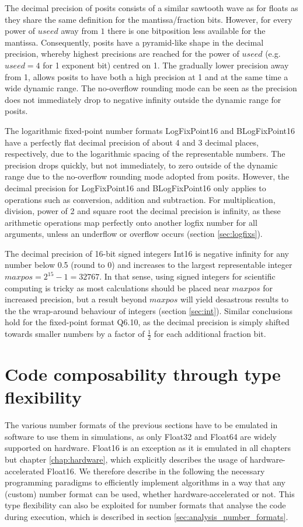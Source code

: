 The decimal precision of posits consists of a similar sawtooth wave as for floats as they share the same definition 
for the mantissa/fraction bits. However, for every power of $useed$ away from $1$ there is one bitposition less
available for the mantissa. Consequently, posits have a pyramid-like shape in the decimal precision, whereby
highest precisions are reached for the power of $useed$ (e.g. $useed = 4$ for 1 exponent bit) centred on 1.
The gradually lower precision away from 1, allows posits to have both a high precision at 1 and at the same time
a wide dynamic range. The no-overflow rounding mode can be seen as the precision does not immediately drop
to negative infinity outside the dynamic range for posits.

The logarithmic fixed-point number formats LogFixPoint16 and BLogFixPoint16 have a perfectly flat decimal precision
of about 4 and 3 decimal places, respectively, due to the logarithmic spacing of the representable numbers.
The precision drops quickly, but not immediately, to zero outside of the dynamic range due to the no-overflow rounding
mode adopted from posits. However, the decimal precision for LogFixPoint16 and BLogFixPoint16 only applies to
operations such as conversion, addition and subtraction. For multiplication, division, power of 2 and square root 
the decimal precision is infinity, as these arithmetic operations map perfectly onto another logfix number for all arguments,
unless an underflow or overflow occurs (section \ref{sec:logfixs}).

The decimal precision of 16-bit signed integers Int16 is negative infinity for any number below 0.5 (round to 0) and
increases to the largest representable integer $maxpos = 2^{15} - 1 =  32767$. In that sense, using signed integers for scientific
computing is tricky as most calculations should be placed near $maxpos$ for increased precision, but a result beyond
$maxpos$ will yield desastrous results to the the wrap-around behaviour of integers (section \ref{sec:int}).
Similar conclusions hold for the fixed-point format Q6.10, as the decimal precision is simply shifted towards smaller
numbers by a factor of $\tfrac{1}{2}$ for each additional fraction bit.

\section{Code composability through type flexibility}
\label{sec:type_flexible}

The various number formats of the previous sections have to be emulated in software to use them in simulations, as only
Float32 and Float64 are widely supported on hardware. Float16 is an exception as it is emulated in all chapters but
chapter \ref{chap:hardware}, which explicitly describes the usage of hardware-accelerated Float16. We therefore
describe in the following the necessary programming paradigms to efficiently implement algorithms in a way
that any (custom) number format can be used, whether hardware-accelerated or not. This type flexibility can also
be exploited for number formats that analyse the code during execution, which is described in section \ref{sec:analysis_number_formats}.

